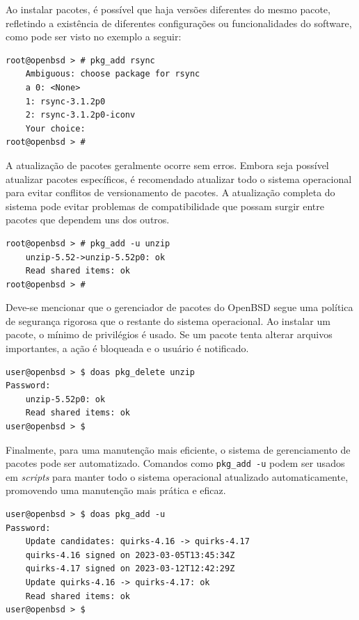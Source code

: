\documentclass[a4paper,10pt]{article}
\begin{document}
Ao instalar pacotes, é possível que haja versões diferentes do mesmo pacote, refletindo a existência de diferentes configurações ou funcionalidades do software, como pode ser visto no exemplo a seguir:

\begin{lstlisting}[caption=Instalação do \textbf{rsync}]
root@openbsd > # pkg_add rsync
    Ambiguous: choose package for rsync
    a 0: <None>
    1: rsync-3.1.2p0
    2: rsync-3.1.2p0-iconv
    Your choice:
root@openbsd > #
\end{lstlisting}

A atualização de pacotes geralmente ocorre sem erros. Embora seja possível atualizar pacotes específicos, é recomendado atualizar todo o sistema operacional para evitar conflitos de versionamento de pacotes. A atualização completa do sistema pode evitar problemas de compatibilidade que possam surgir entre pacotes que dependem uns dos outros.

\begin{lstlisting}[caption=Atualização do \textbf{unzip}]
root@openbsd > # pkg_add -u unzip
    unzip-5.52->unzip-5.52p0: ok
    Read shared items: ok
root@openbsd > #
\end{lstlisting}

Deve-se mencionar que o gerenciador de pacotes do OpenBSD segue uma política de segurança rigorosa que o restante do sistema operacional. Ao instalar um pacote, o mínimo de privilégios é usado. Se um pacote tenta alterar arquivos importantes, a ação é bloqueada e o usuário é notificado.

\begin{lstlisting}[caption=Remoção do \textbf{unzip} utilizando o \textit{doas} e \textit{pkg\_delete}]
user@openbsd > $ doas pkg_delete unzip
Password:
    unzip-5.52p0: ok
    Read shared items: ok
user@openbsd > $
\end{lstlisting}

Finalmente, para uma manutenção mais eficiente, o sistema de gerenciamento de pacotes pode ser automatizado. Comandos como \verb|pkg_add -u| podem ser usados em \textit{scripts} para manter todo o sistema operacional atualizado automaticamente, promovendo uma manutenção mais prática e eficaz.

\begin{lstlisting}[caption=Atualização de todos os pacotes utilizando o \textit{doas} e o \textit{pkg\_add -u}]
user@openbsd > $ doas pkg_add -u
Password:
    Update candidates: quirks-4.16 -> quirks-4.17
    quirks-4.16 signed on 2023-03-05T13:45:34Z
    quirks-4.17 signed on 2023-03-12T12:42:29Z
    Update quirks-4.16 -> quirks-4.17: ok
    Read shared items: ok
user@openbsd > $
\end{lstlisting}
\end{document}
